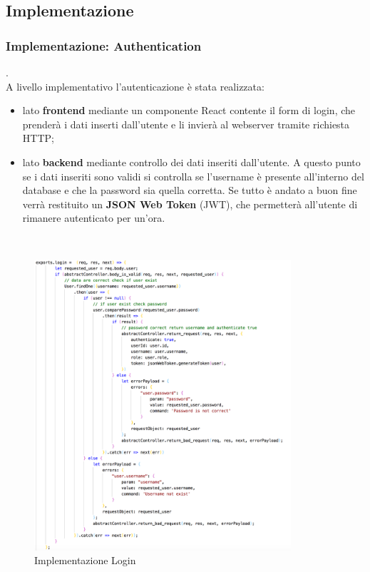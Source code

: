 \documentclass{llncs}
\begin{document}
\pagebreak
\subsection{Implementazione}
\label{ImplementazioneReq1}
\subsubsection{Implementazione: Authentication} .
\label{ImplementazioneReq1Auth}
\vspace*{1ex}
\\
A livello implementativo l'autenticazione \`e stata realizzata:
\begin{itemize}
    \item lato \textbf{frontend} mediante un componente React contente il form di login, che prender\`a i dati inserti dall'utente e li invier\`a al webserver tramite richiesta HTTP;
    \item lato \textbf{backend} mediante controllo dei dati inseriti dall'utente. A questo punto se i dati inseriti sono validi si controlla se l'username \`e presente all'interno del database e che la password sia quella corretta. Se tutto \`e andato a buon fine verr\`a restituito un \textbf{JSON Web Token} (JWT), che permetter\`a all'utente di rimanere autenticato per un'ora.
\end{itemize}\\
\begin{figure}
    \centering
    \includegraphics[width=0.85\textwidth]{Immagini/Login-code.png}
    \caption{Implementazione Login}
    \label{fig:my_label}
\end{figure}
\end{document}
